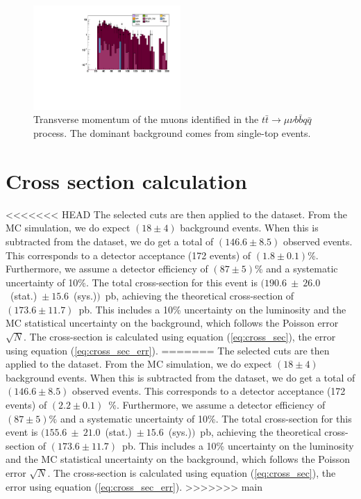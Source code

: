 \documentclass[%
 reprint,
 amsmath,amssymb,
 aps,
]{revtex4-2}
\begin{document}
\begin{figure}
    \centering
    \includegraphics[width=0.5\textwidth]{Plots/part1/Muon_Pt.pdf}
    \caption{Transverse momentum of the muons identified in the $t \bar t \rightarrow \mu \nu b \bar b q \bar q$ process. The dominant background comes from single-top events.}
    \label{fig:muon_pt}
\end{figure}

\section{Cross section calculation}
<<<<<<< HEAD
The selected cuts are then applied to the dataset. From the MC simulation, we do expect $(18 \pm 4)$ background events. When this is subtracted from the dataset, we do get a total of $(146.6 \pm 8.5)$ observed events. This corresponds to a detector acceptance (172 events) of $(1.8 \pm 0.1)$\%. Furthermore, we assume a detector efficiency of $(87 \pm 5)$\% and a systematic uncertainty of 10\%. 
The total cross-section for this event is $(190.6~\pm~26.0$~(stat.)~$\pm~15.6$~(sys.)$)$~pb, achieving the theoretical cross-section of $(173.6 \pm 11.7)$~pb. This includes a 10\% uncertainty on the luminosity and the MC statistical uncertainty on the background, which follows the Poisson error $\sqrt{N}$. The cross-section is calculated using equation (\ref{eq:cross_sec}), the error using equation (\ref{eq:cross_sec_err}).
=======
The selected cuts are then applied to the dataset. From the MC simulation, we do expect $(18 \pm 4)$ background events. When this is subtracted from the dataset, we do get a total of $(146.6 \pm 8.5)$ observed events. This corresponds to a detector acceptance (172 events) of $(2.2 \pm 0.1)$~\%. Furthermore, we assume a detector efficiency of $(87 \pm 5)\%$ and a systematic uncertainty of 10\%. 
The total cross-section for this event is $(155.6~\pm~21.0$~(stat.)~$\pm~15.6$~(sys.)$)$~pb, achieving the theoretical cross-section of $(173.6 \pm 11.7)$~pb. This includes a 10\% uncertainty on the luminosity and the MC statistical uncertainty on the background, which follows the Poisson error $\sqrt{N}$. The cross-section is calculated using equation (\ref{eq:cross_sec}), the error using equation (\ref{eq:cross_sec_err}).
>>>>>>> main
\end{document}
